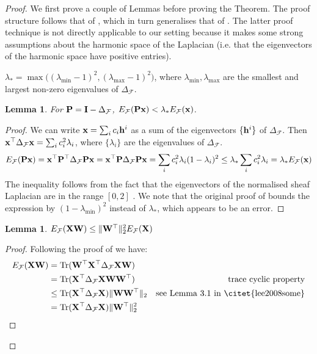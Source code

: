 \documentclass{article}
\newtheorem{lemma}[theorem]{Lemma}
\def\vh{{\bf{h}}}
\def\vx{{\bf{x}}}
\def\mI{{\bf{I}}}
\def\mP{{\bf{P}}}
\def\mW{{\bf{W}}}
\def\mX{{\bf{X}}}
\def\gF{{\mathcal{F}}}
\DeclarePairedDelimiter{\norm}{\lVert}{\rVert}
\DeclareMathOperator{\Tr}{\mathrm{Tr}}
\begin{document}
\GraphOversmoothing*
\begin{proof}
We first prove a couple of Lemmas before proving the Theorem. The proof structure follows that of \citet{cai2020note}, which in turn generalises that of \citet{oono2019graph}. The latter proof technique is not directly applicable to our setting because it makes some strong assumptions about the harmonic space of the Laplacian (i.e. that the eigenvectors of the harmonic space have positive entries). 

$\lambda_* = \max\big((\lambda_\mathrm{min} - 1)^2, (\lambda_\mathrm{max} - 1)^2\big)$, where $\lambda_\mathrm{min}, \lambda_\mathrm{max}$ are the smallest and largest non-zero eigenvalues of $\Delta_\gF$.

\begin{lemma}
For $\mP = \mI - \Delta_\gF$, $E_\gF(\mP \vx) < \lambda_* E_\gF(\vx)$.
\end{lemma}

\begin{proof}
We can write $\vx = \sum_i c_i \vh^i$ as a sum of the eigenvectors $\{\vh^i\}$ of $\Delta_\gF$. Then $\vx^\top \Delta_\gF \vx = \sum_i c_i^2 \lambda_i$, where $\{\lambda_i\}$ are the eigenvalues of $\Delta_\gF$. 
\begin{align}
    E_\gF(\mP \vx) = \vx^\top \mP^\top \Delta_\gF \mP \vx = \vx^\top \mP \Delta_\gF \mP \vx = \sum_i c_i^2 \lambda_i (1 - \lambda_i)^2 \leq \lambda_* \sum_i c_i^2 \lambda_i = \lambda_* E_\gF(\vx)
\end{align}
The inequality follows from the fact that the eigenvectors of the normalised sheaf Laplacian are in the range $[0, 2]$ \citep[Proposition 5.5]{hansen2019toward}. We note that the original proof of \citet{cai2020note} bounds the expression by $(1 - \lambda_\mathrm{min})^2$ instead of $\lambda_*$, which appears to be an error. 
\end{proof}

\begin{lemma}
$E_\gF(\mX \mW) \leq \norm{\mW^\top}^2_2 E_\gF(\mX)$
\end{lemma}

\begin{proof}
Following the proof of \citet{cai2020note} we have:
\begin{align}
    E_\gF(\mX \mW) &= \Tr(\mW^\top \mX^\top \Delta_\gF \mX \mW) \\
    &= \Tr (\mX^\top \Delta_\gF \mX \mW \mW^\top) & \text{trace cyclic property} \\
    &\leq \Tr(\mX^\top \Delta_\gF \mX) \norm{\mW \mW^\top}_2 & \text{see Lemma 3.1 in \citet{lee2008some}} \\
    &= \Tr(\mX^\top \Delta_\gF \mX) \norm{\mW^\top}^2_2
\end{align}
\end{proof}


\end{proof}
\end{document}
